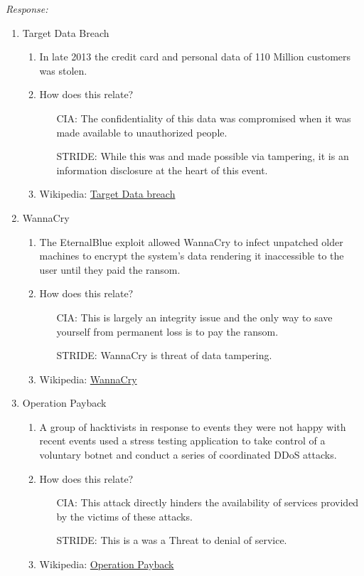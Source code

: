 \documentclass[a4paper, 11pt]{article}
\newenvironment{response}
                {\textit{Response:}}
                {}
\begin{document}
 \begin{response}
   \begin{enumerate}[label=\arabic*)]
   \item Target Data Breach
     \begin{enumerate}[label=\alph*.]
     \item In late 2013 the credit card and personal data of 110 Million customers was stolen.
     \item How does this relate?
       \begin{itemize}
       \item[CIA:] The confidentiality of this data was compromised when it was made available to unauthorized people.
       \item[STRIDE:] While this was and made possible via tampering, it is an information disclosure at the heart of this event.
       \end{itemize}
     \item Wikipedia: \href{https://en.wikipedia.org/wiki/History_of_Target_Corporation#2013_security_breach}{Target Data breach}
     \end{enumerate}
   \item WannaCry
     \begin{enumerate}[label=\alph*.]
     \item The EternalBlue exploit allowed WannaCry to infect unpatched older machines to encrypt the system's data rendering it inaccessible to the user until they paid the ransom.
     \item How does this relate?
       \begin{itemize}
       \item[CIA:] This is largely an integrity issue and the only way to save yourself from permanent loss is to pay the ransom.
       \item[STRIDE:] WannaCry is threat of data tampering.
       \end{itemize}
     \item Wikipedia: \href{https://en.wikipedia.org/wiki/WannaCry_ransomware_attack}{WannaCry}
     \end{enumerate}
   \item Operation Payback
     \begin{enumerate}[label=\alph*.]
     \item A group of hacktivists in response to events they were not happy with recent events used a stress testing application to take control of a voluntary botnet and conduct a series of coordinated DDoS attacks.
     \item How does this relate?
       \begin{itemize}
       \item[CIA:] This attack directly hinders the availability of services provided by the victims of these attacks.
       \item[STRIDE:] This is a was a Threat to denial of service.
       \end{itemize}
     \item Wikipedia: \href{https://en.wikipedia.org/wiki/Operation_Payback}{Operation Payback}
     \end{enumerate}
   \end{enumerate}


\end{response}
\end{document}
